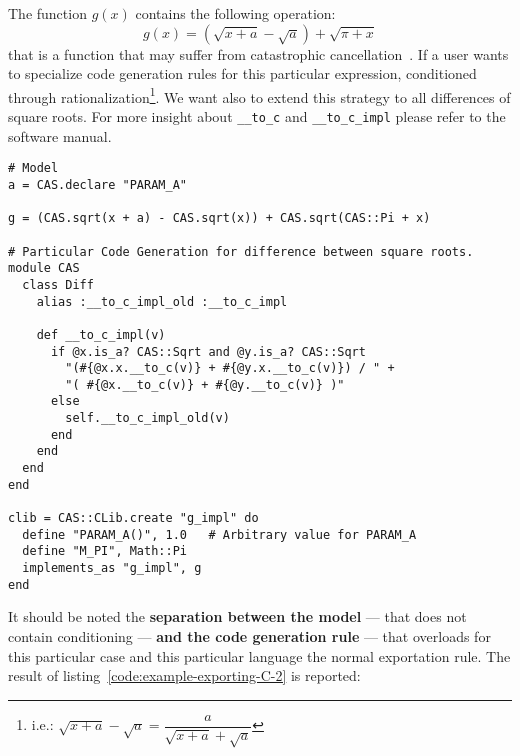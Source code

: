 The function $g(x)$ contains the following operation:
\begin{equation}
g(x) = (\sqrt{x + a} - \sqrt{a}) + \sqrt{\pi + x}
\end{equation}
that is a function that may suffer from catastrophic cancellation~\cite{higham2002accuracy}. If a user wants to specialize code generation
rules for this particular expression, conditioned through rationalization\footnote{i.e.: $\sqrt{x + a} - \sqrt{a} = \dfrac{a}{\sqrt{x + a} + \sqrt{a}}$}. We want also to extend this strategy to all differences of square roots. For more insight about \texttt{\_\_to\_c} and \texttt{\_\_to\_c\_impl} please refer to the software manual.

\noindent%
\begin{lstlisting}[caption={Conditioning in exporting function},label={code:example-exporting-C-2}]
# Model
a = CAS.declare "PARAM_A"

g = (CAS.sqrt(x + a) - CAS.sqrt(x)) + CAS.sqrt(CAS::Pi + x)

# Particular Code Generation for difference between square roots.
module CAS
  class Diff
    alias :__to_c_impl_old :__to_c_impl

    def __to_c_impl(v)
      if @x.is_a? CAS::Sqrt and @y.is_a? CAS::Sqrt
        "(#{@x.x.__to_c(v)} + #{@y.x.__to_c(v)}) / " +
        "( #{@x.__to_c(v)} + #{@y.__to_c(v)} )"
      else
        self.__to_c_impl_old(v)
      end
    end
  end
end

clib = CAS::CLib.create "g_impl" do
  define "PARAM_A()", 1.0   # Arbitrary value for PARAM_A
  define "M_PI", Math::Pi
  implements_as "g_impl", g
end
\end{lstlisting}
It should be noted the \textbf{separation between the model} --- that does not contain conditioning --- \textbf{and the code generation rule} --- that overloads for this particular case and this particular language the normal exportation rule. The result of listing~\ref{code:example-exporting-C-2} is reported:

\noindent%
  \begin{minipage}{.5\textwidth}
    
  \end{minipage}\hfill
  \begin{minipage}{.5\textwidth}
    
  \end{minipage}

